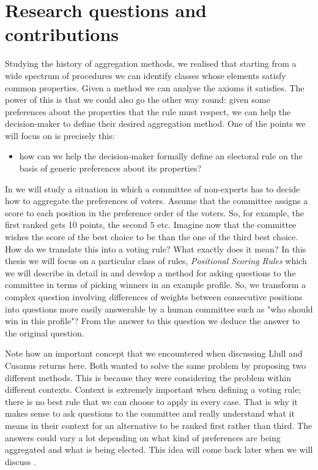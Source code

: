 \section{Research questions and contributions}
Studying the history of aggregation methods, we realised that starting from a wide spectrum of procedures we can identify classes whose elements satisfy common properties. Given a method we can analyse the axioms it satisfies.
The power of this is that we could also go the other way round: given some preferences about the properties that the rule must respect, we can help the decision-maker to define their desired aggregation method. 
One of the points we will focus on is precisely this: 
\begin{itemize}
	\item how can we help the decision-maker formally define an electoral rule on the basis of generic preferences about its properties?
\end{itemize}
In  we will study a situation in which a committee of non-experts has to decide how to aggregate the preferences of voters. 
Assume that the committee assigns a score to each position in the preference order of the voters. So, for example, the first ranked gets 10 points, the second 5 etc.
Imagine now that the committee wishes the score of the best choice to be  than the one of the third best choice.
How do we translate this  into a voting rule? What exactly does it mean?
In this thesis we will focus on a particular class of rules, \textit{Positional Scoring Rules} \textemdash which we will describe in detail in  \textemdash and develop a method for asking questions to the committee in terms of picking winners in an example profile. 
So, we transform a complex question involving differences of weights between consecutive positions into questions more easily answerable by a human committee such as "who should win in this profile"? From the answer to this question we deduce the answer to the original question.

Note how an important concept that we encountered when discussing Llull and Cusanus returns here. Both wanted to solve the same problem by proposing two different methods. This is because they were considering the problem within different contexts.
Context is extremely important when defining a voting rule; there is no best rule that we can choose to apply in every case. That is why it makes sense to ask questions to the committee and really understand what it means in their context for an alternative to be ranked first rather than third. The answers could vary a lot depending on what kind of preferences are being aggregated and what is being elected. This idea will come back later when we will discuss .


